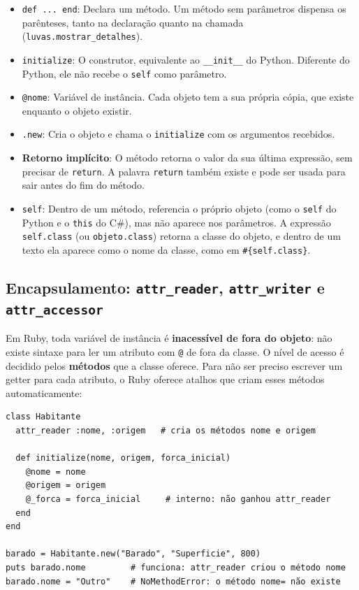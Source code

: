 \begin{itemize}
    \item \texttt{def ... end}: Declara um método. Um método sem parâmetros dispensa os
    parênteses, tanto na declaração quanto na chamada (\texttt{luvas.mostrar\_detalhes}).

    \item \texttt{initialize}: O construtor, equivalente ao \texttt{\_\_init\_\_} do Python.
    Diferente do Python, ele não recebe o \texttt{self} como parâmetro.

    \item \texttt{@nome}: Variável de instância. Cada objeto tem a sua própria cópia, que existe
    enquanto o objeto existir.

    \item \texttt{.new}: Cria o objeto e chama o \texttt{initialize} com os argumentos
    recebidos.

    \item \textbf{Retorno implícito}: O método retorna o valor da sua última expressão, sem
    precisar de \texttt{return}. A palavra \texttt{return} também existe e pode ser usada para
    sair antes do fim do método.

    \item \texttt{self}: Dentro de um método, referencia o próprio objeto (como o \texttt{self}
    do Python e o \texttt{this} do C\#), mas não aparece nos parâmetros. A expressão
    \texttt{self.class} (ou \texttt{objeto.class}) retorna a classe do objeto, e dentro de um
    texto ela aparece como o nome da classe, como em \texttt{\#\{self.class\}}.
\end{itemize}

\subsection{Encapsulamento: \texttt{attr\_reader}, \texttt{attr\_writer} e
\texttt{attr\_accessor}}

Em Ruby, toda variável de instância é \textbf{inacessível de fora do objeto}: não existe sintaxe
para ler um atributo com \texttt{@} de fora da classe. O nível de acesso é decidido pelos
\textbf{métodos} que a classe oferece. Para não ser preciso escrever um getter para cada
atributo, o Ruby oferece atalhos que criam esses métodos automaticamente:

\begin{lstlisting}[style=ruby]
class Habitante
  attr_reader :nome, :origem   # cria os métodos nome e origem

  def initialize(nome, origem, forca_inicial)
    @nome = nome
    @origem = origem
    @_forca = forca_inicial     # interno: não ganhou attr_reader
  end
end

barado = Habitante.new("Barado", "Superficie", 800)
puts barado.nome         # funciona: attr_reader criou o método nome
barado.nome = "Outro"    # NoMethodError: o método nome= não existe
\end{lstlisting}

